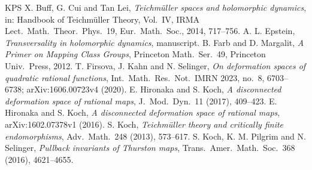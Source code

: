 \documentclass[12pt]{article}
\theoremstyle{remark}
\numberwithin{equation}{section}
\begin{document}
\begin{thebibliography}{KPS}
X. Buff, G. Cui and Tan Lei,
\emph{Teichm\"uller spaces and holomorphic dynamics},
in: Handbook of Teichm\"uller Theory, Vol.\ IV, IRMA Lect.\ Math.\ Theor.\
Phys.\ 19, Eur.\ Math.\ Soc., 2014, 717--756.
A. L. Epstein,
\emph{Transversality in holomorphic dynamics},
manuscript.
B. Farb and D. Margalit,
\emph{A Primer on Mapping Class Groups},
Princeton Math.\ Ser.\ 49, Princeton Univ.\ Press, 2012.
T. Firsova, J. Kahn and N. Selinger,
\emph{On deformation spaces of quadratic rational functions},
Int.\ Math.\ Res.\ Not.\ IMRN 2023, no.\ 8, 6703--6738; arXiv:1606.00723v4
(2020).
E. Hironaka and S. Koch,
\emph{A disconnected deformation space of rational maps},
J.\ Mod.\ Dyn.\ 11 (2017), 409--423.
E. Hironaka and S. Koch,
\emph{A disconnected deformation space of rational maps},
arXiv:1602.07378v1 (2016).
S. Koch,
\emph{Teichm\"uller theory and critically finite endomorphisms},
Adv.\ Math.\ 248 (2013), 573--617.
S. Koch, K. M. Pilgrim and N. Selinger,
\emph{Pullback invariants of Thurston maps},
Trans.\ Amer.\ Math.\ Soc.\ 368 (2016), 4621--4655.
\end{thebibliography}
\end{document}
